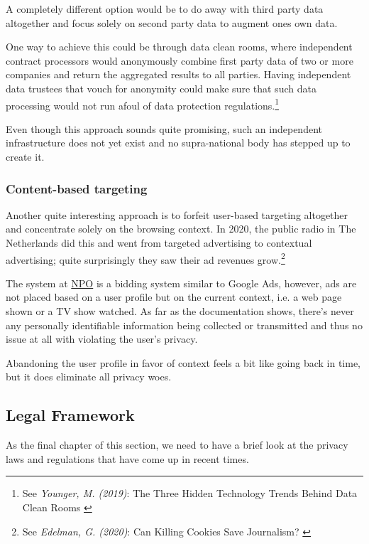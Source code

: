 A completely different option would be to do away with third party data altogether and focus solely on second party data to augment ones own data. 

One way to achieve this could be through data clean rooms, where independent contract processors would anonymously combine first party data of two or more companies and return the aggregated results to all parties. Having independent data trustees that vouch for anonymity could make sure that such data processing would not run afoul of data protection regulations.\footnote{See \textit{Younger, M. (2019)}: The Three Hidden Technology Trends Behind Data Clean Rooms \cite{cleanRoom}}

Even though this approach sounds quite promising, such an independent infrastructure does not yet exist and no supra-national body has stepped up to create it.

\subsubsection{Content-based targeting}

Another quite interesting approach is to forfeit user-based targeting altogether and concentrate solely on the browsing context. In 2020, the public radio in The Netherlands did this and went from targeted advertising to contextual advertising; quite surprisingly they saw their ad revenues grow.\footnote{See \textit{Edelman, G. (2020)}: Can Killing Cookies Save Journalism? \cite{killingCookies}} 

The system at \href{https://over.npo.nl/}{NPO} is a bidding system similar to Google Ads, however, ads are not placed based on a user profile but on the current context, i.e. a web page shown or a TV show watched. As far as the documentation shows, there's never any personally identifiable information being collected or transmitted and thus no issue at all with violating the user's privacy.

Abandoning the user profile in favor of context feels a bit like going back in time, but it does eliminate all privacy woes.

\subsection{Legal Framework}

As the final chapter of this section, we need to have a brief look at the privacy laws and regulations that have come up in recent times. 

